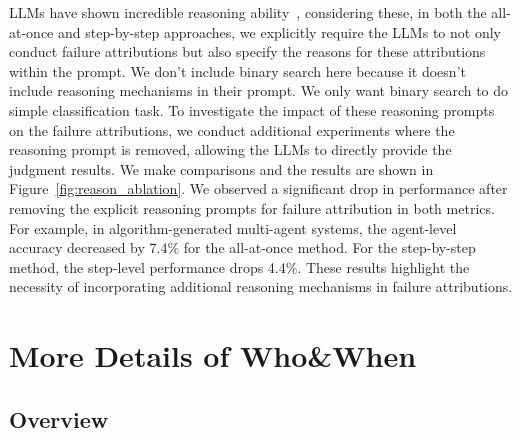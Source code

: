 LLMs have shown incredible reasoning ability~\citep{wei2022chain, yao2024tree, huang2022towards}, considering these, in both the all-at-once and step-by-step approaches, we explicitly require the LLMs to not only conduct failure attributions but also specify the reasons for these attributions within the prompt. We don't include binary search here because it doesn't include reasoning mechanisms in their prompt. We only want binary search to do simple classification task.
To investigate the impact of these reasoning prompts on the failure attributions, we conduct additional experiments where the reasoning prompt is removed, allowing the LLMs to directly provide the judgment results. We make comparisons and the results are shown in Figure~\ref{fig:reason_ablation}.
We observed a significant drop in performance after removing the explicit reasoning prompts for failure attribution in both metrics. For example, in algorithm-generated multi-agent systems, the agent-level accuracy decreased by 7.4\% for the all-at-once method. For the step-by-step method, the step-level performance drops 4.4\%.
These results highlight the necessity of incorporating additional reasoning mechanisms in failure attributions. 



\section{More Details of Who\&When}
\label{section:dataset}

\subsection{Overview}

